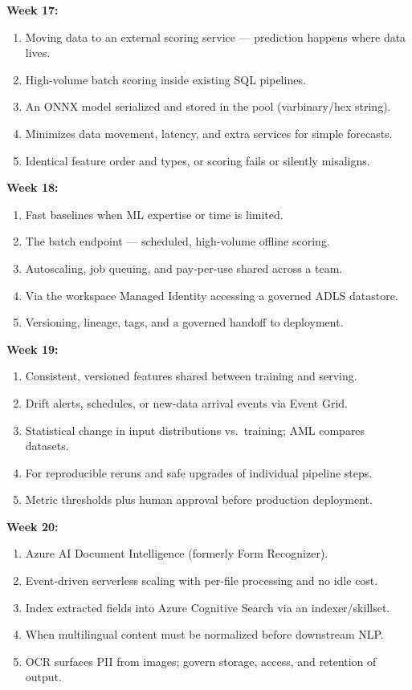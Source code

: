 \documentclass[11pt, a4paper]{article}
\begin{document}
\noindent\textbf{Week 17:}
\begin{enumerate}[itemsep=0pt]
    \item Moving data to an external scoring service --- prediction happens where data lives.
    \item High-volume batch scoring inside existing SQL pipelines.
    \item An ONNX model serialized and stored in the pool (varbinary/hex string).
    \item Minimizes data movement, latency, and extra services for simple forecasts.
    \item Identical feature order and types, or scoring fails or silently misaligns.
\end{enumerate}
\noindent\textbf{Week 18:}
\begin{enumerate}[itemsep=0pt]
    \item Fast baselines when ML expertise or time is limited.
    \item The batch endpoint --- scheduled, high-volume offline scoring.
    \item Autoscaling, job queuing, and pay-per-use shared across a team.
    \item Via the workspace Managed Identity accessing a governed ADLS datastore.
    \item Versioning, lineage, tags, and a governed handoff to deployment.
\end{enumerate}
\noindent\textbf{Week 19:}
\begin{enumerate}[itemsep=0pt]
    \item Consistent, versioned features shared between training and serving.
    \item Drift alerts, schedules, or new-data arrival events via Event Grid.
    \item Statistical change in input distributions vs.\ training; AML compares datasets.
    \item For reproducible reruns and safe upgrades of individual pipeline steps.
    \item Metric thresholds plus human approval before production deployment.
\end{enumerate}
\noindent\textbf{Week 20:}
\begin{enumerate}[itemsep=0pt]
    \item Azure AI Document Intelligence (formerly Form Recognizer).
    \item Event-driven serverless scaling with per-file processing and no idle cost.
    \item Index extracted fields into Azure Cognitive Search via an indexer/skillset.
    \item When multilingual content must be normalized before downstream NLP.
    \item OCR surfaces PII from images; govern storage, access, and retention of output.
\end{enumerate}
\end{document}
